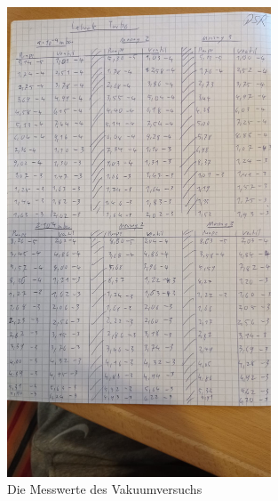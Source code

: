 \begin{figure}[h]
    \centering
    \includegraphics[width=0.7\textwidth]{latex/images/Messwerte_6.jpeg}
    \caption{Die Messwerte des Vakuumversuchs}
\end{figure}


